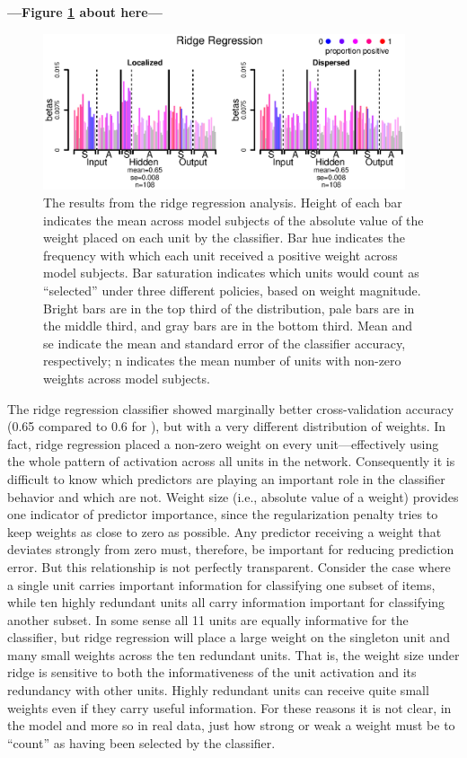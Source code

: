 \begin{center}
\textbf{---Figure \ref{fig.ridge} about here---}
\end{center}

\begin{figure}
\centering
\includegraphics[width=0.95\textwidth]{figures/figure8.eps}
\caption{\label{fig.ridge} The results from the ridge regression analysis. Height of each bar indicates the mean across model subjects of the absolute value of the weight placed on each unit by the classifier. Bar hue indicates the frequency with which each unit received a positive weight across model subjects. Bar saturation indicates which units would count as ``selected'' under three different policies, based on weight magnitude. Bright bars are in the top third of the distribution, pale bars are in the middle third, and gray bars are in the bottom third. Mean and se indicate the mean and standard error of the classifier accuracy, respectively; n indicates the mean number of units with non-zero weights across model subjects.}
\end{figure}

The ridge regression classifier showed marginally better cross-validation accuracy (0.65 compared to 0.6 for {\lasso}), but with a very different distribution of weights. In fact, ridge regression placed a non-zero weight on every unit---effectively using the whole pattern of activation across all units in the network. Consequently it is difficult to know which predictors are playing an important role in the classifier behavior and which are not. Weight size (i.e., absolute value of a weight) provides one indicator of predictor importance, since the regularization penalty tries to keep weights as close to zero as possible. Any predictor receiving a weight that deviates strongly from zero must, therefore, be important for reducing prediction error. But this relationship is not perfectly transparent. Consider the case where a single unit carries important information for classifying one subset of items, while ten highly redundant units all carry information important for classifying another subset. In some sense all 11 units are equally informative for the classifier, but ridge regression will place a large weight on the singleton unit and many small weights across the ten redundant units. That is, the weight size under ridge is sensitive to both the informativeness of the unit activation and its redundancy with other units. Highly redundant units can receive quite small weights even if they carry useful information. For these reasons it is not clear, in the model and more so in real data, just how strong or weak a weight must be to ``count'' as having been selected by the classifier. 

